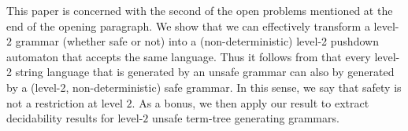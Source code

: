 
This paper is concerned with the second of the open problems mentioned
at the end of the opening paragraph. We show that we can effectively
transform a level-$2$ grammar (whether safe or not) into a
(non-deterministic) level-2 pushdown automaton that accepts the same
language. Thus it follows from \cite{DG86} that every level-2 string
language that is generated by an unsafe grammar can also by generated
by a (level-2, non-deterministic) safe grammar. In this sense, we say that
safety is not a restriction at level $2$.  As a bonus, we then apply
our result to extract decidability results for level-$2$ unsafe
term-tree generating grammars.


